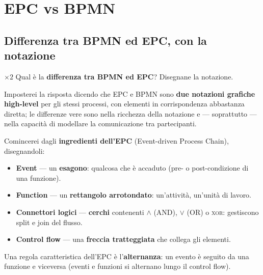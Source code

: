 \chapter{EPC vs BPMN}

\section{Differenza tra BPMN ed EPC, con la notazione}

\begin{domanda}{$\times 2$}
Qual è la \textbf{differenza tra BPMN ed EPC}? Disegnane la notazione.
\end{domanda}

Imposterei la risposta dicendo che EPC e BPMN sono \textbf{due notazioni grafiche high-level} per gli stessi processi, con elementi in corrispondenza abbastanza diretta; le differenze vere sono nella ricchezza della notazione e — soprattutto — nella capacità di modellare la comunicazione tra partecipanti.

Comincerei dagli \textbf{ingredienti dell'EPC} (Event-driven Process Chain), disegnandoli:
\begin{itemize}
  \item \textbf{Event} — un \textbf{esagono}: qualcosa che è accaduto (pre- o post-condizione di una funzione).
  \item \textbf{Function} — un \textbf{rettangolo arrotondato}: un'attività, un'unità di lavoro.
  \item \textbf{Connettori logici} — \textbf{cerchi} contenenti $\wedge$ (AND), $\vee$ (OR) o \textsc{xor}: gestiscono split e join del flusso.
  \item \textbf{Control flow} — una \textbf{freccia tratteggiata} che collega gli elementi.
\end{itemize}
Una regola caratteristica dell'EPC è l'\textbf{alternanza}: un evento è seguito da una funzione e viceversa (eventi e funzioni si alternano lungo il control flow).

